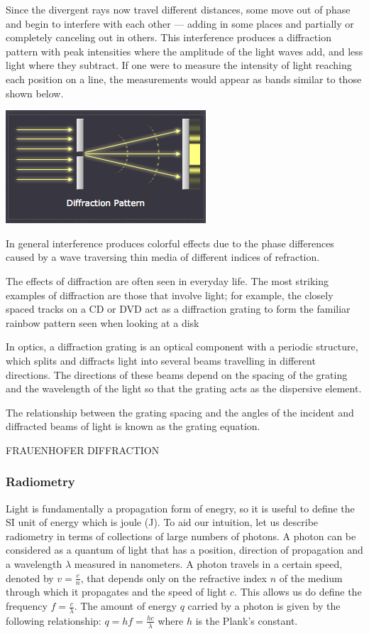 Since the divergent rays now travel different distances, some move out of phase and begin to interfere with each other — adding in some places and partially or completely canceling out in others. This interference produces a diffraction pattern with peak intensities where the amplitude of the light waves add, and less light where they subtract. If one were to measure the intensity of light reaching each position on a line, the measurements would appear as bands similar to those shown below.

\includegraphics[scale=0.5]{images/3.png}

In general interference produces colorful effects due to the phase differences caused by a wave traversing thin media of different indices of refraction.

The effects of diffraction are often seen in everyday life. The most striking examples of diffraction are those that involve light; for example, the closely spaced tracks on a CD or DVD act as a diffraction grating to form the familiar rainbow pattern seen when looking at a disk

In optics, a diffraction grating is an optical component with a periodic structure, which splits and diffracts light into several beams travelling in different directions. The directions of these beams depend on the spacing of the grating and the wavelength of the light so that the grating acts as the dispersive element.

The relationship between the grating spacing and the angles of the incident and diffracted beams of light is known as the grating equation. 

FRAUENHOFER DIFFRACTION

\subsubsection{Radiometry}
Light is fundamentally a propagation form of enegry, so it is useful to define the SI unit of energy which is joule (J). To aid our intuition, let us describe radiometry in terms of collections of large numbers of photons. A photon can be considered as a quantum of light that has a position, direction of propagation and a wavelength $\lambda$ measured in nanometers. A photon travels in a certain speed, denoted by $v = \frac{c}{n}$, that depends only on the refractive index $n$ of the medium through which it propagates and the speed of light $c$. This allows us do define the frequency $f = \frac{c}{\lambda}$. The amount of energy $q$ carried by a photon is given by the following relationship: $q = hf=  \frac{hc}{\lambda}$ where $h$ is the Plank's constant.

